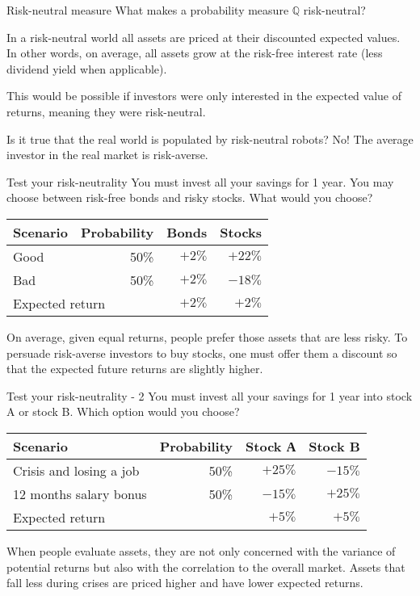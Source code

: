 \documentclass{beamer}
\begin{document}
\begin{frame}{Risk-neutral measure}
\justify
What makes a probability measure $\mathbb{Q}$ risk-neutral?

\justify
In a risk-neutral world all assets are priced at their discounted expected values. In other words, on average, all assets grow at the risk-free interest rate (less dividend yield when applicable).

\justify
This would be possible if investors were only interested in the expected value of returns, meaning they were \alert{risk-neutral}.

\justify
Is it true that the real world is populated by risk-neutral robots? No! The average investor in the real market is \alert{risk-averse}.
\end{frame}



\begin{frame}{Test your risk-neutrality}
\justify
You must invest all your savings for 1 year. You may choose between risk-free bonds and risky stocks. What would you choose?

\justify
\centering
\begin{tabular}{l|r|r|r}
Scenario & Probability & Bonds & Stocks \\ \hline
Good & 50\%   & $+2\%$    & $+22\%$  \\
Bad   & 50\%   & $+2\%$    & $-18\%$  \\ \hline
\multicolumn{2}{l|}{Expected return} & $+2\%$ & $+2\%$
\end{tabular}

\pause
\justify
On average, given equal returns, people prefer those assets that are less risky. To persuade risk-averse investors to buy stocks, one must offer them a discount so that the expected future returns are slightly higher.
\end{frame}



\begin{frame}{Test your risk-neutrality - 2}
\justify
You must invest all your savings for 1 year into stock A or stock B. Which option would you choose?

\justify
\centering
\begin{tabular}{l|r|r|r}
Scenario & Probability & Stock А & Stock B \\ \hline
Crisis and losing a job  & 50\%    & $+25\%$ & $-15\%$  \\
12 months salary bonus    & 50\%    & $-15\%$ & $+25\%$  \\ \hline
\multicolumn{2}{l|}{Expected return} & $+5\%$  & $+5\%$
\end{tabular}

\pause
\justify
When people evaluate assets, they are not only concerned with the variance of potential returns but also with the correlation to the overall market. Assets that fall less during crises are priced higher and have lower expected returns.
\end{frame}
\end{document}
